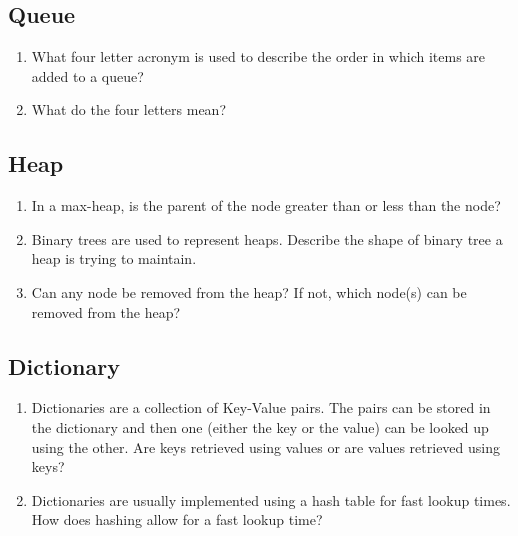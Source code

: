 \documentclass{article}
\begin{document}
	\subsection{Queue}
		\begin{enumerate}
			\item What four letter acronym is used to describe the
			order in which items are added to a queue? 
			\item What do the four letters mean? 
		\end{enumerate}
	\subsection{Heap}
		\begin{enumerate}
			\item In a max-heap, is the parent of the node greater than
			or less than the node? 
			\item Binary trees are used to represent heaps.
			Describe the shape of binary tree a heap is trying to
			maintain. 
			\item Can any node be removed from the heap? If not,
			which node(s) can be removed from the heap? 
		\end{enumerate}
	\subsection{Dictionary}
		\begin{enumerate}
			\item Dictionaries are a collection of Key-Value pairs.
			The pairs can be stored in the dictionary and then one
			(either the key or the value) can be looked up using
			the other. Are keys retrieved using values or are
			values retrieved using keys? 
			\item Dictionaries are usually implemented using a hash
			table for fast lookup times. How does hashing allow for
			a fast lookup time? 
		\end{enumerate}
\end{document}
